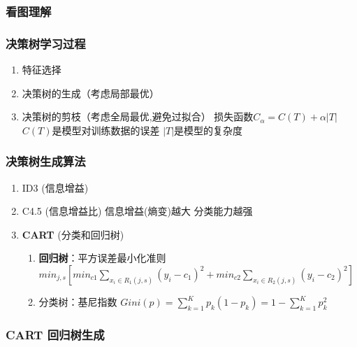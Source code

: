 \documentclass[11pt]{article}
\providecommand{\tightlist}{%
      \setlength{\itemsep}{0pt}\setlength{\parskip}{0pt}}
\begin{document}
    \subsubsection{看图理解}\label{ux770bux56feux7406ux89e3}

    

    \subsubsection{决策树学习过程}\label{ux51b3ux7b56ux6811ux5b66ux4e60ux8fc7ux7a0b}

\begin{enumerate}
\def\labelenumi{\arabic{enumi}.}
\tightlist
\item
  特征选择
\item
  决策树的生成（考虑局部最优）
\item
  决策树的剪枝（考虑全局最优,避免过拟合）
  损失函数\(C_\alpha=C(T)+\alpha|T|\) \(C(T)\)是模型对训练数据的误差
  \(|T|\)是模型的复杂度
\end{enumerate}

    \subsubsection{决策树生成算法}\label{ux51b3ux7b56ux6811ux751fux6210ux7b97ux6cd5}

\begin{enumerate}
\def\labelenumi{\arabic{enumi}.}
\tightlist
\item
  ID3 (信息增益)
\item
  C4.5 (信息增益比) 信息增益(熵变)越大 分类能力越强
\item
  \textbf{CART} (分类和回归树)

  \begin{enumerate}
  \def\labelenumii{\arabic{enumii}.}
  \tightlist
  \item
    \textbf{回归树}：平方误差最小化准则
    \(min_{j,s}[min_{c1}\sum_{x_i\in R_1(j,s)}(y_i-c_1)^2+min_{c2}\sum_{x_i\in R_2(j,s)}(y_i-c_2)^2]\)
  \item
    分类树：基尼指数
    \(Gini(p) = \sum_{k=1}^{K}p_{k}(1-p_{k}) = 1 - \sum_{k=1}^K p_k^2\)
  \end{enumerate}
\end{enumerate}

    \subsubsection{CART
回归树生成}\label{cart-ux56deux5f52ux6811ux751fux6210}
\end{document}
